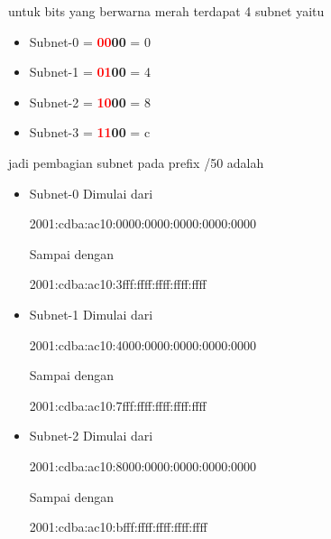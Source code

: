 \documentclass{article}
\begin{document}
\begin{flushleft}
        untuk bits yang berwarna merah terdapat 4 subnet yaitu

        \begin{itemize}
            \item[] Subnet-0 = \textbf{\textcolor{red}{00}00} = 0
            \item[] Subnet-1 = \textbf{\textcolor{red}{01}00} = 4
            \item[] Subnet-2 = \textbf{\textcolor{red}{10}00} = 8
            \item[] Subnet-3 = \textbf{\textcolor{red}{11}00} = c
        \end{itemize}

        jadi pembagian subnet pada prefix /50 adalah 

        \begin{itemize}
            \item[] Subnet-0 \newline
            Dimulai dari 
            \begin{center}
                2001:cdba:ac10:0000:0000:0000:0000:0000
            \end{center}

            Sampai dengan 
            \begin{center}
                2001:cdba:ac10:3fff:ffff:ffff:ffff:ffff
            \end{center}

            \item[] Subnet-1 \newline
            Dimulai dari 
            \begin{center}
                2001:cdba:ac10:4000:0000:0000:0000:0000
            \end{center}

            Sampai dengan 
            \begin{center}
                2001:cdba:ac10:7fff:ffff:ffff:ffff:ffff
            \end{center}

            \item[] Subnet-2 \newline
            Dimulai dari 
            \begin{center}
                2001:cdba:ac10:8000:0000:0000:0000:0000
            \end{center}

            Sampai dengan 
            \begin{center}
                2001:cdba:ac10:bfff:ffff:ffff:ffff:ffff
            \end{center}
            

\end{itemize}
\end{flushleft}
\end{document}
